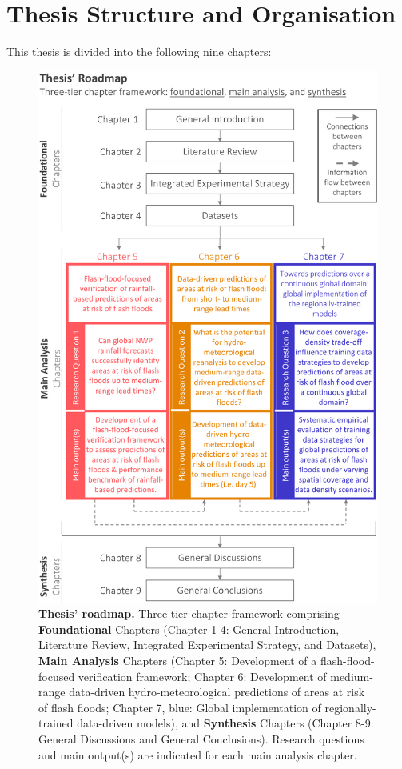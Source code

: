 \section{Thesis Structure and Organisation}
This thesis is divided into the following nine chapters:

\begin{figure}[htbp]
\centering
\includegraphics[width=\textwidth]{thesis_roadmap.png}
\caption{\textbf{Thesis' roadmap.} Three-tier chapter framework comprising \textbf{Foundational} Chapters (Chapter 1-4: General Introduction, Literature Review, Integrated Experimental Strategy, and Datasets), \textbf{Main Analysis} Chapters (\textcolor{colour_chapter5}{Chapter 5: Development of a flash-flood-focused verification framework}; \textcolor{colour_chapter6}{Chapter 6: Development of medium-range data-driven hydro-meteorological predictions of areas at risk of flash floods}; \textcolor{colour_chapter7}{Chapter 7, blue: Global implementation of regionally-trained data-driven models}), and \textbf{Synthesis} Chapters (Chapter 8-9: General Discussions and General Conclusions). Research questions and main output(s) are indicated for each main analysis chapter.}
\label{fig:thesis_structure}
\end{figure}


